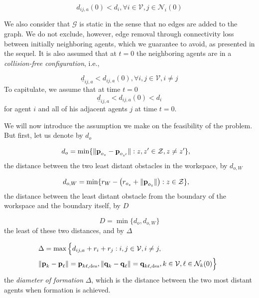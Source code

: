 \begin{equation} \label{eq:initially_connected}
  d_{ij,a}(0) < d_i, \forall i \in \mathcal{V}, j \in \mathcal{N}_i(0)
\end{equation}

We also consider that $\mathcal{G}$ is static in the sense that no edges are
added to the graph. We do not exclude, however, edge removal through
connectivity loss between initially neighboring agents, which we guarantee
to avoid, as presented in the sequel. It is also assumed that at $t=0$ the
neighboring agents are in a \textit{collision-free configuration}, i.e.,

\begin{equation}
  \underline{d}_{ij, a} < d_{ij,a}(0), \forall i,j \in \mathcal{V}, i \neq j
\label{eq:initially_coll_free}
\end{equation}
To capitulate, we assume that at time $t=0$
$$\underline{d}_{ij,a} < d_{ij,a}(0) < d_i$$
for agent $i$ and all of his adjacent agents $j$ at time $t=0$.

We will now introduce the assumption we make on the feasibility of the
problem. But first, let us denote by $d_o$

\begin{align*}
  d_o &= \min\{\| \bm{\mathbf{p}}_{o_z} - \bm{\mathbf{p}}_{o_{z'}}\| : z,z' \in \mathcal{Z}, z \neq z' \},
\end{align*}
the distance between the two least distant obstacles in the workspace,
by $d_{o,W}$

\begin{align*}
  d_{o,W} &= \min\{r_W - \left( r_{o_z} + \| \bm{\mathbf{p}}_{o_z} \| \right) : z \in \mathcal{Z}\},
\end{align*}
the distance between the least distant obstacle from the boundary of the
workspace and the boundary itself, by $D$

\begin{equation*}
  D = \min\{d_o, d_{o,W}\}
\end{equation*}
the least of these two distances, and by $\Delta$

\begin{align*}
  &\hspace{-2mm} \Delta =  \max\Big\{d_{ij, a}+r_i+r_j: i, j \in \mathcal{V}, i \neq j, \notag \\
  &\hspace{-2mm} \| \vect{p}_k - \vect{p}_\ell \| = \vect{p}_{k \ell,\text{des}},
  \|\vect{q}_k - \vect{q}_\ell\| = \vect{q}_{k \ell,\text{des}},
  k \in \mathcal{V},
  \ell \in \mathcal{N}_k(0)\Big\}
\end{align*}
the \emph{diameter of formation} $\Delta$, which is the
distance between the two most distant agents when formation is achieved.

